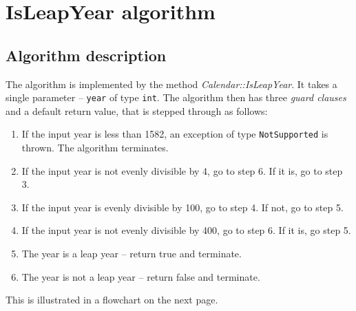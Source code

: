 \documentclass[11pt,a4paper]{article}
\begin{document}
 

\section{IsLeapYear algorithm}

\subsection{Algorithm description}
The algorithm is implemented by the method \textit{Calendar::IsLeapYear}. It takes a single parameter -- \texttt{year} of type \texttt{int}. The algorithm then has three \textit{guard clauses} and a default return value, that is stepped through as follows:

\begin{enumerate}[label=\textbf{Step \arabic*:}]
    \item If the input year is less than 1582, an exception of type \texttt{NotSupported} is thrown. The algorithm terminates.
    \item If the input year is not evenly divisible by 4, go to step 6. If it is, go to step 3.
    \item If the input year is evenly divisible by 100, go to step 4. If not, go to step 5.
    \item If the input year is not evenly divisible by 400, go to step 6. If it is, go step 5.
    \item The year is a leap year -- return true and terminate.
    \item The year is not a leap year -- return false and terminate.
\end{enumerate}
This is illustrated in a flowchart on the next page.
\newpage
\end{document}
